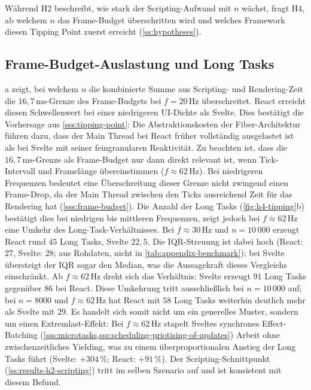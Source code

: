 Während H2 beschreibt, wie stark der Scripting-Aufwand mit $n$ wächst, fragt H4, ab welchem $n$ das Frame-Budget überschritten wird und welches Framework diesen Tipping Point zuerst erreicht (\cref{ss:hypotheses}).

\subsection{Frame-Budget-Auslastung und Long Tasks}
\label{ss:results-h4-tipping}

a zeigt, bei welchem $n$ die kombinierte Summe aus Scripting- und Rendering-Zeit die $16{,}7\,\text{ms}$-Grenze des Frame-Budgets bei $f = 20\,\text{Hz}$ überschreitet. React erreicht diesen Schwellenwert bei einer niedrigeren UI-Dichte als Svelte. Dies bestätigt die Vorhersage aus \cref{sss:tipping-point}: Die Abstraktionskosten der Fiber-Architektur führen dazu, dass der Main Thread bei React früher vollständig ausgelastet ist als bei Svelte mit seiner feingranularen Reaktivität.
Zu beachten ist, dass die $16{,}7\,\text{ms}$-Grenze als Frame-Budget nur dann direkt relevant ist, wenn Tick-Intervall und Framelänge übereinstimmen ($f \approx 62\,\text{Hz}$). Bei niedrigeren Frequenzen bedeutet eine Überschreitung dieser Grenze nicht zwingend einen Frame-Drop, da der Main Thread zwischen den Ticks ausreichend Zeit für das Rendering hat (\cref{sss:frame-budget}). Die Anzahl der Long Tasks (\cref{fig:h4-tipping}b) bestätigt dies bei niedrigen bis mittleren Frequenzen, zeigt jedoch bei $f \approx 62\,\text{Hz}$ eine Umkehr des Long-Task-Verhältnisses. Bei $f \approx 30\,\text{Hz}$ und $n = 10\,000$ erzeugt React rund $45$ Long Tasks, Svelte $22{,}5$. Die IQR-Streuung ist dabei hoch (React: $27$, Svelte: $28$; aus Rohdaten, nicht in \cref{tab:appendix-benchmark}); bei Svelte übersteigt der IQR sogar den Median, was die Aussagekraft dieses Vergleichs einschränkt. Ab $f \approx 62\,\text{Hz}$ dreht sich das Verhältnis: Svelte erzeugt $91$ Long Tasks gegenüber $86$ bei React. Diese Umkehrung tritt ausschließlich bei $n = 10\,000$ auf; bei $n = 8000$ und $f \approx 62\,\text{Hz}$ hat React mit $58$ Long Tasks weiterhin deutlich mehr als Svelte mit $29$. Es handelt sich somit nicht um ein generelles Muster, sondern um einen Extremlast-Effekt: Bei $f \approx 62\,\text{Hz}$ stapelt Sveltes synchrones Effect-Batching (\cref{sss:microtasks,sss:scheduling-priotising-of-updates}) Arbeit ohne zwischenzeitliches Yielding, was zu einem überproportionalen Anstieg der Long Tasks führt (Svelte: $+\!304\,\%$; React: $+\!91\,\%$). Der Scripting-Schnittpunkt (\cref{ss:results-h2-scripting}) tritt im selben Szenario auf und ist konsistent mit diesem Befund.
